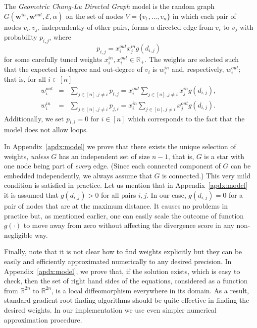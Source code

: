\documentclass[11pt]{article}
\newcommand{\R}{{\mathbb R}}
\newcommand{\emb}{\mathcal E}
\begin{document}
The \emph{Geometric Chung-Lu Directed Graph} model is the random graph $G(\textbf{w}^{in}, \textbf{w}^{out}, \emb, \alpha)$ on the set of nodes $V = \{ v_1, \ldots, v_n \}$ in which each pair of nodes $v_i, v_j$, independently of other pairs, forms a directed edge from $v_i$ to $v_j$ with probability $p_{i,j}$, where
\begin{equation*}
p_{i,j} = x_i^{out} x_j^{in} g(d_{i,j})
\end{equation*}
for some carefully tuned weights $x_i^{in}, x_i^{out} \in \R_+$. The weights are selected such that the expected in-degree and out-degree of $v_i$ is $w_i^{in}$ and, respectively, $w_i^{out}$; that is, for all $i \in [n]$
\begin{eqnarray*}
w_i^{out} &=& \sum_{j \in [n], j\neq i} p_{i,j} =  x_i^{out} \sum_{j \in [n], j\neq i} x_j^{in} g(d_{i,j}), \\
w_i^{in} &=& \sum_{j \in [n], j\neq i} p_{j,i} =  x_i^{in} \sum_{j \in [n], j\neq i} x_j^{out} g(d_{i,j}).
\end{eqnarray*}
Additionally, we set $p_{i,i}=0$ for $i\in[n]$ which corresponds to the fact that the model does not allow loops.

In Appendix~\ref{apdx:model} we prove that there exists the unique selection of weights, \emph{unless} $G$ has an independent set of size $n-1$, that is, $G$ is a star with one node being part of \emph{every} edge. (Since each connected component of $G$ can be embedded independently, we always assume that $G$ is connected.) This very mild condition is satisfied in practice. Let us mention that in Appendix~\ref{apdx:model} it is assumed that $g(d_{i,j}) > 0$ for all pairs $i,j$. In our case, $g(d_{i,j}) = 0$ for a pair of nodes that are at the maximum distance. It causes no problems in practice but, as mentioned earlier, one can easily scale the outcome of function $g(\cdot)$ to move away from zero without affecting the divergence score in any non-negligible way. 

Finally, note that it is not clear how to find weights explicitly but they can be easily and efficiently approximated numerically to any desired precision. In Appendix~\ref{apdx:model}, we prove that, if the solution exists, which is easy to check, then the set of right hand sides of the equations, considered as a function from $\mathbb{R}^{2n}$ to $\mathbb{R}^{2n}$, is a local diffeomorphism everywhere in its domain. As a result, standard gradient root-finding algorithms should be quite effective in finding the desired weights. In our implementation we use even simpler numerical approximation procedure.
\end{document}
